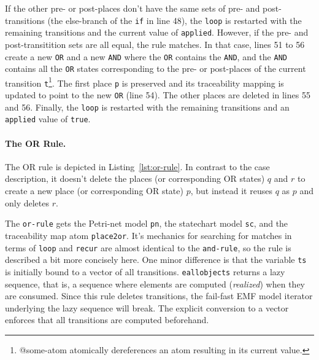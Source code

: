 \documentclass[submission]{eptcs}
\begin{document}
If the other pre- or post-places don't have the same sets of pre- and
post-transitions (the else-branch of the \verb|if| in line 48), the \verb|loop|
is restarted with the remaining transitions and the current value of
\verb|applied|.  However, if the pre- and post-transitition sets are all equal,
the rule matches.  In that case, lines 51 to 56 create a new \verb|OR| and a
new \verb|AND| where the \verb|OR| contains the \verb|AND|, and the \verb|AND|
contains all the \verb|OR| states corresponding to the pre- or post-places of
the current transition \verb|t|\footnote{\textsf{@some-atom atomically
    dereferences an atom resulting in its current value.}}.  The first place
\verb|p| is preserved and its traceability mapping is updated to point to the
new \verb|OR| (line 54).  The other places are deleted in lines 55 and 56.
Finally, the \verb|loop| is restarted with the remaining transitions and an
\verb|applied| value of \verb|true|.

\paragraph{The OR Rule.}
\label{sec:or-rule}

The OR rule is depicted in Listing~\ref{lst:or-rule}.  In contrast to the case
description, it doesn't delete the places (or corresponding OR states) $q$ and
$r$ to create a new place (or corresponding OR state) $p$, but instead it
reuses $q$ as $p$ and only deletes $r$.

The \verb|or-rule| gets the Petri-net model \verb|pn|, the statechart model
\verb|sc|, and the traceability map atom \verb|place2or|.  It's mechanics for
searching for matches in terms of \verb|loop| and \verb|recur| are almost
identical to the \verb|and-rule|, so the rule is described a bit more concisely
here.  One minor difference is that the variable \verb|ts| is initially bound
to a vector of all transitions.  \verb|eallobjects| returns a lazy sequence,
that is, a sequence where elements are computed (\emph{realized}) when they are
consumed.  Since this rule deletes transitions, the fail-fast EMF model
iterator underlying the lazy sequence will break.  The explicit conversion to a
vector enforces that all transitions are computed beforehand.
\end{document}
